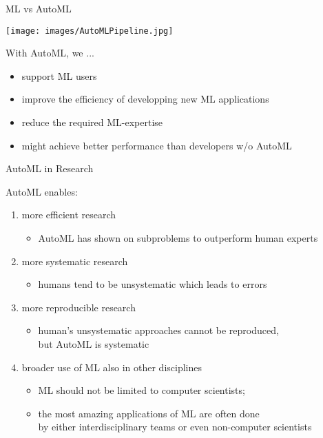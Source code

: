 \begin{frame}[c]{ML vs AutoML}

\begin{center}
\texttt{[image: images/AutoMLPipeline.jpg]}
\end{center}

\bigskip
\pause
With AutoML, we ...
\begin{itemize}
	\item support ML users
	\item improve the efficiency of developping new ML applications
	\item reduce the required ML-expertise 
	\item might achieve better performance than developers w/o AutoML
\end{itemize}

\end{frame}
\begin{frame}[c]{AutoML in Research}

AutoML enables:

\begin{enumerate}
  \item more efficient research
  \begin{itemize}
    \item AutoML has shown on subproblems to outperform human experts
  \end{itemize}
  \pause
  \smallskip
  \item more systematic research
  \begin{itemize}
    \item humans tend to be unsystematic which leads to errors
  \end{itemize}
  \smallskip
  \pause
  \item more reproducible research
  \begin{itemize}
    \item human's unsystematic approaches cannot be reproduced,\\ but AutoML is systematic
  \end{itemize}
  \smallskip
  \pause
  \item broader use of ML also in other disciplines
  \begin{itemize}
    \item ML should not be limited to computer scientists;
    \item the most amazing applications of ML are often done\\ by either interdisciplinary teams or even non-computer scientists
  \end{itemize}
\end{enumerate}

\end{frame}
